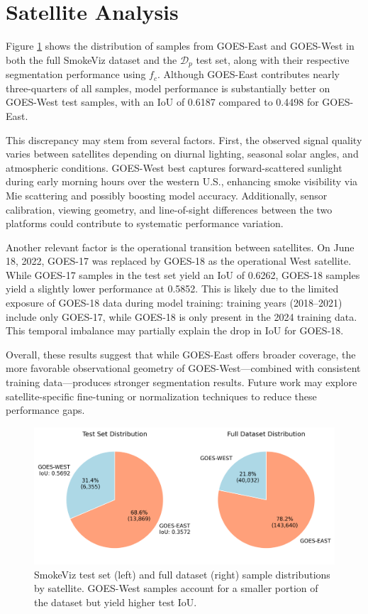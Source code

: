 \documentclass{article}
\begin{document}
\section{Satellite Analysis}

Figure \ref{sat_dataset} shows the distribution of samples from GOES-East and GOES-West in both the full SmokeViz dataset and the \(\mathcal{D}_p\) test set, along with their respective segmentation performance using \(f_c\). Although GOES-East contributes nearly three-quarters of all samples, model performance is substantially better on GOES-West test samples, with an IoU of 0.6187 compared to 0.4498 for GOES-East.

This discrepancy may stem from several factors. First, the observed signal quality varies between satellites depending on diurnal lighting, seasonal solar angles, and atmospheric conditions. GOES-West best captures forward-scattered sunlight during early morning hours over the western U.S., enhancing smoke visibility via Mie scattering and possibly boosting model accuracy. Additionally, sensor calibration, viewing geometry, and line-of-sight differences between the two platforms could contribute to systematic performance variation.

Another relevant factor is the operational transition between satellites. On June 18, 2022, GOES-17 was replaced by GOES-18 as the operational West satellite. While GOES-17 samples in the test set yield an IoU of 0.6262, GOES-18 samples yield a slightly lower performance at 0.5852. This is likely due to the limited exposure of GOES-18 data during model training: training years (2018–2021) include only GOES-17, while GOES-18 is only present in the 2024 training data. This temporal imbalance may partially explain the drop in IoU for GOES-18.

Overall, these results suggest that while GOES-East offers broader coverage, the more favorable observational geometry of GOES-West—combined with consistent training data—produces stronger segmentation results. Future work may explore satellite-specific fine-tuning or normalization techniques to reduce these performance gaps.

\begin{figure}[!htb]
    \centering
    \includegraphics[width=\linewidth]{stat_figs/satellite_test_full_dataset.png}
    \caption{SmokeViz test set (left) and full dataset (right) sample distributions by satellite. GOES-West samples account for a smaller portion of the dataset but yield higher test IoU.}
    \label{sat_dataset}
\end{figure}
\end{document}
